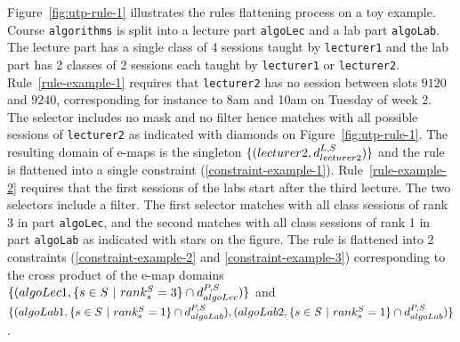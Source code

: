 Figure~\ref{fig:utp-rule-1} illustrates the rules flattening process on a toy example.
Course \texttt{algorithms} is split into a lecture part \texttt{algoLec} and a lab part \texttt{algoLab}.
The lecture part has a single class of 4 sessions taught by \texttt{lecturer1} and the lab part has 2 classes of 2 sessions each taught by \texttt{lecturer1} or \texttt{lecturer2}.
Rule~\ref{rule-example-1} %
requires that \texttt{lecturer2} has no session between slots $9120$ and $9240$, corresponding for instance to 8am and 10am on Tuesday of week 2. %
The selector includes no mask and no filter hence matches with all possible sessions of \texttt{lecturer2} 
as indicated with diamonds on Figure~\ref{fig:utp-rule-1}. 
The resulting domain of e-maps is the singleton $\{(lecturer2,d^{L,S}_{lecturer2})\}$
and the rule is flattened into a single \texttt{\FORBIDDENPERIOD} constraint (\ref{constraint-example-1}). %
Rule~\ref{rule-example-2}
requires that the first sessions of the labs start after the third lecture.
The two selectors include a filter. The first selector matches with all class sessions of rank 3 in part \texttt{algoLec}, 
and the second matches with all class sessions of rank 1 in part \texttt{algoLab} as indicated with stars on the figure.
The rule is flattened into 2 \texttt{\SEQUENCED} constraints (\ref{constraint-example-2} and \ref{constraint-example-3}) corresponding to the cross product of the e-map domains 
$\myset{(algoLec1,\myset{s\in\SESSION\ |\ \sessionrank{s}=3}\cap\map{\PART}{\SESSION}{algoLec})}$
and $\myset{(algoLab1,\myset{s\in\SESSION\ |\ \sessionrank{s}=1}\cap\map{\PART}{\SESSION}{algoLab}),(algoLab2,\myset{s\in\SESSION\ |\ \sessionrank{s}=1}\cap\map{\PART}{\SESSION}{algoLab})}$.